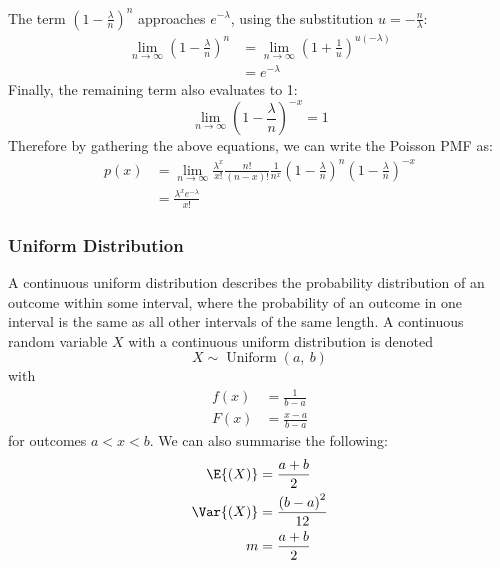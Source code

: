 \documentclass{article}
\begin{document}
The term \(\left( 1 - \frac{\lambda}{n} \right)^n\) approaches
\(e^{-\lambda}\), using the substitution \(u = -\frac{n}{\lambda}\):
\begin{align*}
    \lim_{n \to \infty} \left( 1 - \frac{\lambda}{n} \right)^n & = \lim_{n \to \infty} \left( 1 + \frac{1}{u} \right)^{u \left( -\lambda \right)} \\
                                                               & = e^{-\lambda}
\end{align*}
Finally, the remaining term also evaluates to 1:
\begin{equation*}
    \lim_{n \to \infty} \left( 1 - \frac{\lambda}{n} \right)^{-x} = 1
\end{equation*}
Therefore by gathering the above equations, we can write the Poisson PMF as:
\begin{align*}
    p\left( x \right) & = \lim_{n \to \infty} \frac{\lambda^x}{x!} \frac{n!}{\left( n - x \right)!} \frac{1}{n^x} \left( 1 - \frac{\lambda}{n} \right)^n \left( 1 - \frac{\lambda}{n} \right)^{-x} \\
                      & = \frac{\lambda^x e^{-\lambda}}{x!}
\end{align*}
\subsubsection{Uniform Distribution}
A continuous uniform distribution describes the probability
distribution of an outcome within some interval, where the probability
of an outcome in one interval is the same as all other intervals of the
same length. A continuous random variable \(X\) with a continuous
uniform distribution is denoted
\begin{equation*}
    X \sim \operatorname{Uniform}{\left( a,\: b \right)}
\end{equation*}
with
\begin{align*}
    f\left( x \right) & = \frac{1}{b - a}     \\
    F\left( x \right) & = \frac{x - a}{b - a}
\end{align*}
for outcomes \(a < x < b\).
We can also summarise the following:
\begin{align*}
    \E{\left( X \right)}   & = \frac{a + b}{2}                   \\
    \Var{\left( X \right)} & = \frac{\left( b - a \right)^2}{12} \\
    m                      & = \frac{a + b}{2}
\end{align*}
\end{document}

